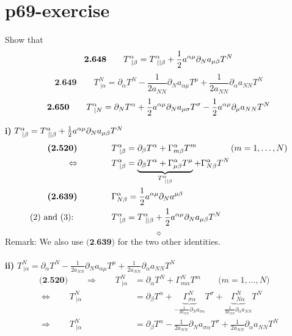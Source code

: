 \section{p69-exercise}
\begin{tcolorbox}
Show that
$$\textbf{2.648}\quad\quad T^{\alpha}_{\ |\beta} = T^{\alpha}_{\ ||\beta} + \frac{1}{2} a^{\alpha \mu} \partial_N a_{\mu\beta}T^N$$
$$\textbf{2.649}\quad\quad T^{N}_{\ |\alpha} = \partial_{\alpha}T^{N} - \frac{1}{2 a_{NN}} \partial_N a_{\alpha\mu}T^{\mu} + \frac{1}{2 a_{NN}} \partial_{\alpha} a_{NN}T^{N}$$
$$\textbf{2.650}\quad\quad T^{\alpha}_{\ |N} = \partial_{N}T^{\alpha}  + \frac{1}{2} a^{\alpha\mu} \partial_N a_{\mu\sigma}T^{\sigma} - \frac{1}{2} a^{\alpha\mu}  \partial_{\mu} a_{NN}T^{N}$$
\end{tcolorbox}
\textbf{i)} $T^{\alpha}_{\ |\beta} = T^{\alpha}_{\ ||\beta} + \frac{1}{2} a^{\alpha \mu} \partial_N a_{\mu\beta}T^N$\\
\begin{align}
\textbf{(2.520)}\spatie & T^{\alpha}_{\ |\beta} = \partial_{\beta}T^{\alpha}+\Gamma^{\alpha}_{m\beta}T^m \spatie \text{(}m = 1,\dots,N \text{)}\\
\Leftrightarrow \spatie & T^{\alpha}_{\ |\beta} = \underbrace{ \partial_{\beta}T^{\alpha}+ \Gamma^{\alpha}_{\mu \beta} T^{\mu}}_{T^{\alpha}_{ \ || \beta}} +\Gamma^{\alpha}_{N \beta}T^{N}\\
\textbf{(2.639)}\spatie &\Gamma^{\alpha}_{N\beta} = \half a^{\alpha \mu}\partial_N a^{\mu \beta}\\
\text{(2) and (3): }\spatie & T^{\alpha}_{\ |\beta} = T^{\alpha}_{\ ||\beta} + \half a^{\alpha \mu} \partial_N a_{\mu\beta}T^N
\end{align}
$$\diamond$$
Remark: We also use $\textbf{(2.639)}$ for the two other identities.\\\\
\textbf{ii)} $T^{N}_{\ |\alpha} = \partial_{\alpha}T^{N} - \frac{1}{2 a_{NN}} \partial_N a_{\alpha\mu}T^{\mu} + \frac{1}{2 a_{NN}} \partial_{\alpha} a_{NN}T^{N}$\\
\begin{align*}
\textbf{(2.520)}\quad\quad \Rightarrow \quad\quad T^{N}_{\ |\alpha} &= \partial_{\alpha}T^{N}+\Gamma^{N}_{m\alpha}T^m \quad\quad\text{(}m = 1,\dots,N \text{)}\\
\Leftrightarrow \quad\quad T^{N}_{\ |\alpha} &=  \partial_{\beta}T^{\alpha}+ \underbrace{\Gamma^{N}_{\sigma \alpha}}_{ - \frac{1}{2a_{NN}}\partial_N a_{\sigma\alpha}} T^{\sigma } +\underbrace{\Gamma^{N}_{N \alpha}}_{ \frac{1}{2a_{NN}}\partial_{\alpha} a_{NN}}T^{N}\\
\Rightarrow \quad\quad T^{N}_{\ |\alpha} &=  \partial_{\beta}T^{\alpha} - \frac{1}{2a_{NN}}\partial_N a_{\sigma\alpha}T^{\sigma } +\frac{1}{2a_{NN}}\partial_{\alpha} a_{NN}T^{N}
\end{align*}\\
